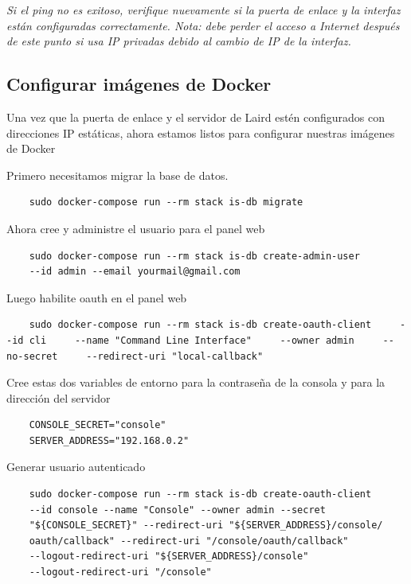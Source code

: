 \textit{Si el ping no es exitoso, verifique nuevamente si la puerta de enlace y la interfaz están configuradas correctamente. Nota: debe perder el acceso a Internet después de este punto si usa IP privadas debido al cambio de IP de la interfaz.}

\subsection{Configurar imágenes de Docker}

Una vez que la puerta de enlace y el servidor de Laird estén configurados con direcciones IP
estáticas, ahora estamos listos para configurar nuestras imágenes de Docker

Primero necesitamos migrar la base de datos.

\begin{lstlisting}
    sudo docker-compose run --rm stack is-db migrate
\end{lstlisting}

Ahora cree y administre el usuario para el panel web

\begin{lstlisting}
    sudo docker-compose run --rm stack is-db create-admin-user 
    --id admin --email yourmail@gmail.com
\end{lstlisting}

Luego habilite oauth en el panel web

\begin{lstlisting}
    sudo docker-compose run --rm stack is-db create-oauth-client     --id cli     --name "Command Line Interface"     --owner admin     --no-secret     --redirect-uri "local-callback" 
\end{lstlisting}

Cree estas dos variables de entorno para la contraseña de la consola y para la dirección del
servidor

\begin{lstlisting}
    CONSOLE_SECRET="console"
    SERVER_ADDRESS="192.168.0.2"
\end{lstlisting}

Generar usuario autenticado

\begin{lstlisting}
    sudo docker-compose run --rm stack is-db create-oauth-client
    --id console --name "Console" --owner admin --secret 
    "${CONSOLE_SECRET}" --redirect-uri "${SERVER_ADDRESS}/console/
    oauth/callback" --redirect-uri "/console/oauth/callback" 
    --logout-redirect-uri "${SERVER_ADDRESS}/console"  
    --logout-redirect-uri "/console" 
\end{lstlisting}

